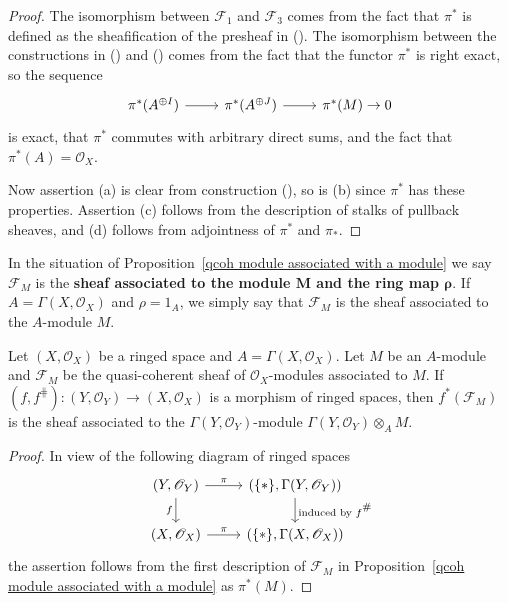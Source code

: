 \begin{proof}
The isomorphism between $\mathscr{F}_1$ and $\mathscr{F}_3$ comes from the fact that $\pi^*$ is defined as the sheafification of the presheaf in (). The isomorphism between the constructions in () and () comes from the fact that the functor $\pi^*$ is right exact, so the sequence
\[\begin{tikzcd}
\pi^*(A^{\oplus I})\ar[r]&\pi^*(A^{\oplus J})\ar[r]&\pi^*(M)\to 0
\end{tikzcd}\] 
is exact, that $\pi^*$ commutes with arbitrary direct sums, and the fact that $\pi^*(A)=\mathscr{O}_X$.\par
Now assertion (a) is clear from construction (), so is (b) since $\pi^*$ has these properties. Assertion (c) follows from the description of stalks of pullback sheaves, and (d) follows from adjointness of $\pi^*$ and $\pi_*$.
\end{proof}
In the situation of Proposition~\ref{qcoh module associated with a module} we say $\mathscr{F}_M$ is the \textbf{sheaf associated to the module $\bm{M}$ and the ring map $\bm{\rho}$}. If $A=\Gamma(X,\mathscr{O}_X)$ and $\rho=1_A$, we simply say that $\mathscr{F}_M$ is the sheaf associated to the $A$-module $M$.
\begin{proposition}\label{qcoh module associated with a module and pull back}
Let $(X,\mathscr{O}_X)$ be a ringed space and $A=\Gamma(X,\mathscr{O}_X)$. Let $M$ be an $A$-module and $\mathscr{F}_M$ be the quasi-coherent sheaf of $\mathscr{O}_X$-modules associated to $M$. If $(f,f^{\hash}):(Y,\mathscr{O}_Y)\to(X,\mathscr{O}_X)$ is a morphism of ringed spaces, then $f^*(\mathscr{F}_M)$ is the sheaf associated to the $\Gamma(Y,\mathscr{O}_Y)$-module $\Gamma(Y,\mathscr{O}_Y)\otimes_AM$.
\end{proposition}
\begin{proof}
In view of the following diagram of ringed spaces
\begin{equation*}
\begin{tikzcd}
(Y,\mathscr{O}_Y)\ar[r,"\pi"]\ar[d,swap,"f"]&(\{\ast\},\Gamma(Y,\mathscr{O}_Y))\ar[d,"\text{induced by $f^{\hash}$}"]\\
(X,\mathscr{O}_X)\ar[r,"\pi"]&(\{\ast\},\Gamma(X,\mathscr{O}_X))
\end{tikzcd}
\end{equation*}
the assertion follows from the first description of $\mathscr{F}_M$ in Proposition~\ref{qcoh module associated with a module} as $\pi^*(M)$.
\end{proof}
